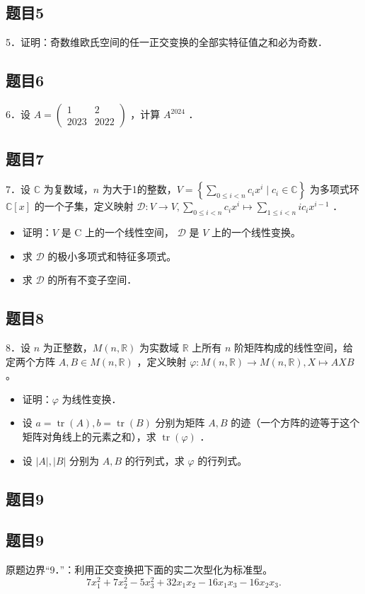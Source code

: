 \documentclass{article}
\begin{document}
\subsection{题目5}
5．证明：奇数维欧氏空间的任一正交变换的全部实特征值之和必为奇数．

\subsection{题目6}
6．设 \(A=\left(\begin{array}{cc}1 & 2 \\ 2023 & 2022\end{array}\right)\) ，计算 \(A^{2024}\) ．

\subsection{题目7}
7．设 \(\mathbb{C}\) 为复数域，\(n\) 为大于1的整数，\(V=\left\{\sum_{0 \leq i<n} c_{i} x^{i} \mid c_{i} \in \mathbb{C}\right\}\) 为多项式环 \(\mathbb{C}[x]\) 的一个子集，定义映射 \(\mathcal{D}: V \rightarrow V, \sum_{0 \leq i<n} c_{i} x^{i} \mapsto \sum_{1 \leq i<n} i c_{i} x^{i-1}\) ．

\begin{itemize}
  \item[（1）] 证明：\(V\) 是 C 上的一个线性空间， \(\mathcal{D}\) 是 \(V\) 上的一个线性变换。
  \item[（2）] 求 \(\mathcal{D}\) 的极小多项式和特征多项式。
  \item[（3）] 求 \(\mathcal{D}\) 的所有不变子空间．
\end{itemize}

\subsection{题目8}
8．设 \(n\) 为正整数，\(M(n, \mathbb{R})\) 为实数域 \(\mathbb{R}\) 上所有 \(n\) 阶矩阵构成的线性空间，给定两个方阵 \(A, B \in M(n, \mathbb{R})\) ，定义映射 \(\varphi: M(n, \mathbb{R}) \rightarrow M(n, \mathbb{R}), X \mapsto A X B\) 。

\begin{itemize}
  \item[（1）] 证明：\(\varphi\) 为线性变换．
  \item[（2）] 设 \(a=\operatorname{tr}(A), b=\operatorname{tr}(B)\) 分别为矩阵 \(A, B\) 的迹（一个方阵的迹等于这个矩阵对角线上的元素之和），求 \(\operatorname{tr}(\varphi)\) ．
  \item[（3）] 设 \(|A|,|B|\) 分别为 \(A, B\) 的行列式，求 \(\varphi\) 的行列式。
\end{itemize}

\begin{itemize}

\subsection{题目9}
\end{itemize}

\subsection{题目9}
原题边界“9．”：利用正交变换把下面的实二次型化为标准型。
\[
7 x_{1}^{2}+7 x_{2}^{2}-5 x_{3}^{2}+32 x_{1} x_{2}-16 x_{1} x_{3}-16 x_{2} x_{3} .
\]
\end{document}
